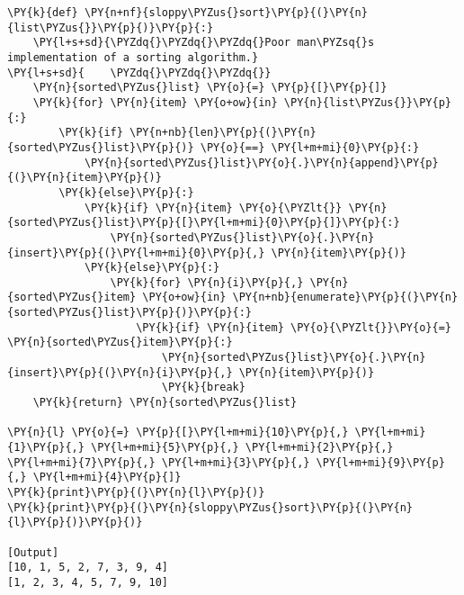 \begin{Verbatim}[label=\makebox{\url{https://bitbucket.org/lbaldini/programming/src/tip/snippets/sloppy\_sort.py}},commandchars=\\\{\}]
\PY{k}{def} \PY{n+nf}{sloppy\PYZus{}sort}\PY{p}{(}\PY{n}{list\PYZus{}}\PY{p}{)}\PY{p}{:}
    \PY{l+s+sd}{\PYZdq{}\PYZdq{}\PYZdq{}Poor man\PYZsq{}s implementation of a sorting algorithm.}
\PY{l+s+sd}{    \PYZdq{}\PYZdq{}\PYZdq{}}
    \PY{n}{sorted\PYZus{}list} \PY{o}{=} \PY{p}{[}\PY{p}{]}
    \PY{k}{for} \PY{n}{item} \PY{o+ow}{in} \PY{n}{list\PYZus{}}\PY{p}{:}
        \PY{k}{if} \PY{n+nb}{len}\PY{p}{(}\PY{n}{sorted\PYZus{}list}\PY{p}{)} \PY{o}{==} \PY{l+m+mi}{0}\PY{p}{:}
            \PY{n}{sorted\PYZus{}list}\PY{o}{.}\PY{n}{append}\PY{p}{(}\PY{n}{item}\PY{p}{)}
        \PY{k}{else}\PY{p}{:}
            \PY{k}{if} \PY{n}{item} \PY{o}{\PYZlt{}} \PY{n}{sorted\PYZus{}list}\PY{p}{[}\PY{l+m+mi}{0}\PY{p}{]}\PY{p}{:}
                \PY{n}{sorted\PYZus{}list}\PY{o}{.}\PY{n}{insert}\PY{p}{(}\PY{l+m+mi}{0}\PY{p}{,} \PY{n}{item}\PY{p}{)}
            \PY{k}{else}\PY{p}{:}
                \PY{k}{for} \PY{n}{i}\PY{p}{,} \PY{n}{sorted\PYZus{}item} \PY{o+ow}{in} \PY{n+nb}{enumerate}\PY{p}{(}\PY{n}{sorted\PYZus{}list}\PY{p}{)}\PY{p}{:}
                    \PY{k}{if} \PY{n}{item} \PY{o}{\PYZlt{}}\PY{o}{=} \PY{n}{sorted\PYZus{}item}\PY{p}{:}
                        \PY{n}{sorted\PYZus{}list}\PY{o}{.}\PY{n}{insert}\PY{p}{(}\PY{n}{i}\PY{p}{,} \PY{n}{item}\PY{p}{)}
                        \PY{k}{break}
    \PY{k}{return} \PY{n}{sorted\PYZus{}list}

\PY{n}{l} \PY{o}{=} \PY{p}{[}\PY{l+m+mi}{10}\PY{p}{,} \PY{l+m+mi}{1}\PY{p}{,} \PY{l+m+mi}{5}\PY{p}{,} \PY{l+m+mi}{2}\PY{p}{,} \PY{l+m+mi}{7}\PY{p}{,} \PY{l+m+mi}{3}\PY{p}{,} \PY{l+m+mi}{9}\PY{p}{,} \PY{l+m+mi}{4}\PY{p}{]}
\PY{k}{print}\PY{p}{(}\PY{n}{l}\PY{p}{)}
\PY{k}{print}\PY{p}{(}\PY{n}{sloppy\PYZus{}sort}\PY{p}{(}\PY{n}{l}\PY{p}{)}\PY{p}{)}

[Output]
[10, 1, 5, 2, 7, 3, 9, 4]
[1, 2, 3, 4, 5, 7, 9, 10]
\end{Verbatim}